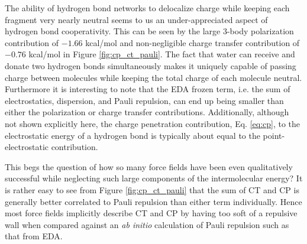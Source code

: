 \documentclass[journal=jctcce,manuscript=article]{achemso}
\begin{document}
The ability of hydrogen bond networks to delocalize charge while keeping each fragment very nearly neutral seems to us an under-appreciated aspect of hydrogen bond cooperativity. This can be seen by the large 3-body polarization contribution of $-1.66$ kcal/mol and non-negligible charge transfer contribution of $-0.76$ kcal/mol in Figure \ref{fig:cp_ct_pauli}. The fact that water can receive and donate two hydrogen bonds simultaneously makes it uniquely capable of passing charge between molecules while keeping the total charge of each molecule neutral. Furthermore it is interesting to note that the EDA frozen term, i.e. the sum of electrostatics, dispersion, and Pauli repulsion, can end up being smaller than either the polarization or charge transfer contributions. Additionally, although not shown explicitly here, the charge penetration contribution, Eq. \ref{eq:cp}, to the electrostatic energy of a hydrogen bond is typically about equal to the point-electrostatic contribution.

This begs the question of how so many force fields have been even qualitatively successful while neglecting such large components of the intermolecular energy? It is rather easy to see from Figure \ref{fig:cp_ct_pauli} that the sum of CT and CP is generally better correlated to Pauli repulsion than either term individually. Hence most force fields implicitly describe CT and CP by having too soft of a repulsive wall when compared against an \textit{ab initio} calculation of Pauli repulsion such as that from EDA.
\end{document}
